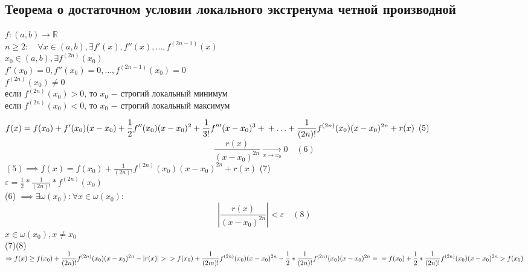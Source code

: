 \subsection{Теорема о достаточном условии локального экстренума четной производной}
\begin{theorem}
	$f: (a,b)\to \mathbb{R}$ \\
	$n\ge 2: \quad \forall x \in (a,b), \exists f'(x), f''(x), \ldots,f^{(2n-1)}(x)$ \\
	$x_0 \in (a,b), \exists f^{(2n)}(x_0)$ \\
	$f'(x_0)=0, f''(x_0)=0, \ldots, f^{(2n-1)}(x_0)=0$ \\
	$f^{(2n)}(x_0)\neq 0$\\
	если $f^{(2n)}(x_0)>0$, то $x_0$ $-$ строгий локальный минимум\\
	если $f^{(2n)}(x_0)<0$, то $x_0$ $-$ строгий локальный максимум

\end{theorem}
\begin{replacementproof}
	$f(x)=f(x_0)+f'(x_0)(x-x_0)+\displaystyle\frac{1}{2}f''(x_0)(x-x_0)^2+\displaystyle\frac{1}{3!}f'''(x-x_0)^{3}+\\ +\ldots+\displaystyle\frac{1}{(2n)!}f^{(2n)}(x_0)(x-x_0)^{2n}+r(x)$ (5)
	\[
	\displaystyle\frac{r(x)}{(x-x_0)^{2n}} \underset{x\to x_0}{\to} 0 \quad (6)
	\] 
	$(5)\implies f(x)=f(x_0)+\displaystyle\frac{1}{(2n)!}f^{(2n)}(x_0)(x-x_0)^{2n}+r(x)$ (7)\\
	$\varepsilon = \displaystyle\frac{1}{2}*\displaystyle\frac{1}{(2n)!}*f^{(2n)}(x_0)$ \\
	(6) $\implies \exists \omega(x_0): \forall x \in \omega(x_0):$ 
	\[
	|\displaystyle\frac{r(x)}{(x-x_0)^{2n}}|<\varepsilon \quad (8)
	\] 
	$x \in \omega(x_0), x \neq x_0$ \\
	(7)(8) $\implies f(x)\ge f(x_0)+\displaystyle\frac{1}{(2n)!}f^{(2n)}(x_0)(x-x_0)^{2n}-|r(x)|>\\ >f(x_0)+\displaystyle\frac{1}{(2m)!}f^{(2n)}(x_0)(x-x_0)^{2n}-\displaystyle\frac{1}{2}*\displaystyle\frac{1}{(2n)!}f^{(2n)}(x_0)(x-x_0)^{2n}=\\ =f(x_0)+\displaystyle\frac{1}{2}*\displaystyle\frac{1}{(2n)!}f^{(2n)}(x_0)(x-x_0)^{2n}>f(x_0)$
\end{replacementproof}


